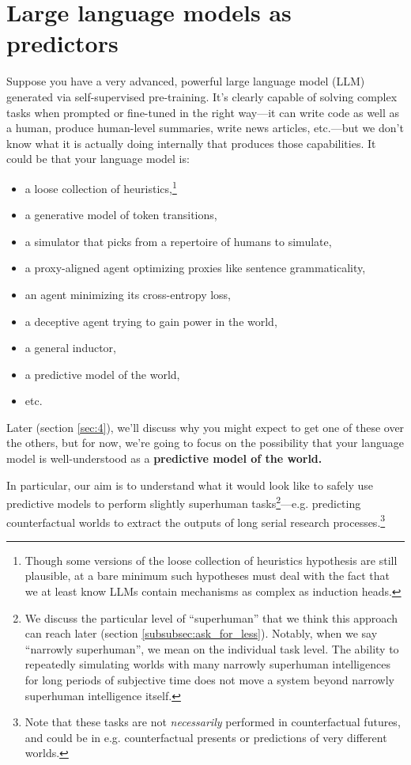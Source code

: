 \documentclass[
  onecolumn,
  natbib,
]{miri-tech-article}
\begin{document}
\tableofcontents



\section{Large language models as predictors}
\label{sec:1}

Suppose you have a very advanced, powerful large language model (LLM) generated via self-supervised pre-training. It's clearly capable of solving complex tasks when prompted or fine-tuned in the right way---it can write code as well as a human, produce human-level summaries, write news articles, etc.---but we don't know what it is actually doing internally that produces those capabilities. It could be that your language model is:


\begin{itemize}
\item a loose collection of heuristics,\footnote{Though some versions of the loose collection of heuristics hypothesis are still plausible, at a bare minimum such hypotheses must deal with the fact that we at least know LLMs contain mechanisms as complex as induction heads\cite{induction-heads}.}
\item a generative model of token transitions,
\item a simulator that picks from a repertoire of humans to simulate,
\item a proxy-aligned agent optimizing proxies like sentence grammaticality,
\item an agent minimizing its cross-entropy loss,
\item a deceptive agent trying to gain power in the world,
\item a general inductor,
\item a predictive model of the world,
\item etc.
\end{itemize}

Later (section \ref{sec:4}), we'll discuss why you might expect to get one of these over the others, but for now, we're going to focus on the possibility that your language model is well-understood as a \textbf{predictive model of the world.}

In particular, our aim is to understand what it would look like to safely use predictive models to perform slightly superhuman tasks\footnote{We discuss the particular level of ``superhuman'' that we think this approach can reach later (section \ref{subsubsec:ask_for_less}). Notably, when we say ``narrowly superhuman'', we mean on the individual task level. The ability to repeatedly simulating worlds with many narrowly superhuman intelligences for long periods of subjective time does not move a system beyond narrowly superhuman intelligence itself.}---e.g. predicting counterfactual worlds to extract the outputs of long serial research processes.\footnote{Note that these tasks are not \textit{necessarily} performed in counterfactual futures, and could be in e.g. counterfactual presents or predictions of very different worlds.}
\end{document}

